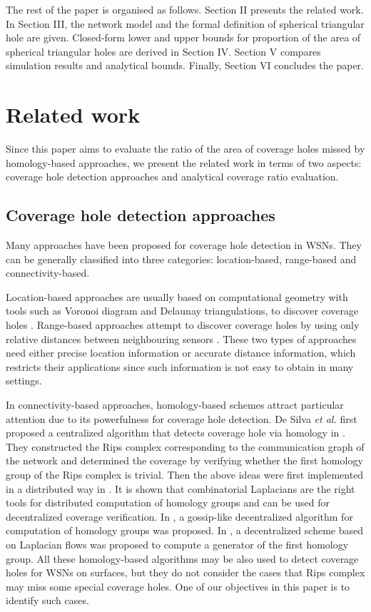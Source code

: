 \documentclass[journal, twoside]{IEEEtran}
\begin{document}
The rest of the paper is organised as follows. Section II presents the related work.
In Section III, the network model and the formal definition of spherical
triangular hole are given. Closed-form lower and upper bounds for proportion
of the area of spherical triangular holes are derived
in Section IV. Section V compares simulation results and analytical bounds.
Finally, Section VI concludes the paper.


\section{Related work}

Since this paper aims to evaluate the ratio of the area of coverage holes missed
by homology-based approaches, we present the related work in terms of two aspects: 
coverage hole detection approaches and analytical coverage ratio evaluation. 

\subsection{Coverage hole detection approaches}

Many approaches have been proposed for coverage hole detection in WSNs.
They can be generally classified into three categories: location-based, 
range-based and connectivity-based. 

Location-based approaches are usually
based on computational geometry with
tools such as Voronoi diagram and Delaunay triangulations, to discover
coverage holes \cite{FGG04, WCL04, ZZF09}. Range-based approaches
attempt to discover coverage holes by using only relative
distances between neighbouring sensors \cite{B08, B12}.
These two types of approaches need either precise location information 
or accurate distance information, which restricts their applications since
such information is not easy to obtain in many settings. 

In connectivity-based approaches, homology-based schemes attract particular
attention due to its powerfulness for coverage hole detection.
De Silva \emph{et al.} first proposed a centralized 
algorithm that detects coverage hole via homology in \cite{DSG07}. They 
constructed the Rips complex corresponding to the communication graph of the 
network and determined the coverage by verifying whether the first homology
group of the Rips complex is trivial. Then the above ideas were first implemented
in a distributed way in \cite{ME06}. It is shown that combinatorial Laplacians are the 
right tools for distributed computation of homology groups and can be used 
for decentralized coverage verification. In \cite{MJ07}, a gossip-like 
decentralized algorithm for computation of homology groups was proposed. 
In \cite{TJ10}, a decentralized scheme based on Laplacian flows was 
proposed to compute a generator of the first homology group. All these homology-based
algorithms may be also used to detect coverage holes for WSNs on surfaces, but they 
do not consider the cases that Rips complex
may miss some special coverage holes. One of our objectives in this paper
is to identify such cases.
\end{document}
